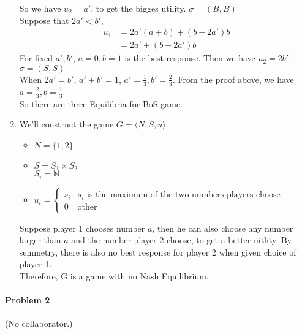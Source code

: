 \documentclass[12pt]{article}
\begin{document}
\begin{enumerate}
            So we have $u_2 = a'$, to get the bigges utility. $\sigma = (B, B)$ \\
            Suppose that $2a' < b'$,
            \begin{align*}
                u_1 &= 2a'(a + b) + (b - 2a')b \\
                    &= 2a' + (b - 2a')b
            \end{align*}
            For fixed $a', b'$, $a = 0, b = 1$ is the best response.
            Then we have $u_2 = 2b'$, $\sigma = (S, S)$ \\
            When $2a' = b'$, $a' + b' = 1$, $a' = \frac{1}{3}, b' = \frac{2}{3}$.
            From the proof above, we have $a = \frac{2}{3}, b = \frac{1}{3}$. \\
            So there are three Equilibria for BoS game.
     \item We'll construct the game $G = \langle N, S, u \rangle$.
           \begin{itemize}
           \item $N = \{1, 2\}$
           \item $S = S_1 \times S_2$ \\
                 $S_i = \mathbb{N}$
           \item $u_i = \begin{cases}
                        s_i &\mbox{$s_i$ is the maximum of the two numbers players choose} \\
                        0 &\mbox{other}
                        \end{cases}$
           \end{itemize}
           Suppose player 1 chooses number $a$, 
           then he can also choose any number larger than $a$ and the number player 2 choose, 
           to get a better uitlity.  
           By semmetry, there is also no best response for player 2 when given choice of player 1. \\
           Therefore, G is a game with no Nash Equilibrium. 

      
          
 
          
\end{enumerate}

\bigskip

\paragraph{Problem 2} (No collaborator.)
\end{document}
